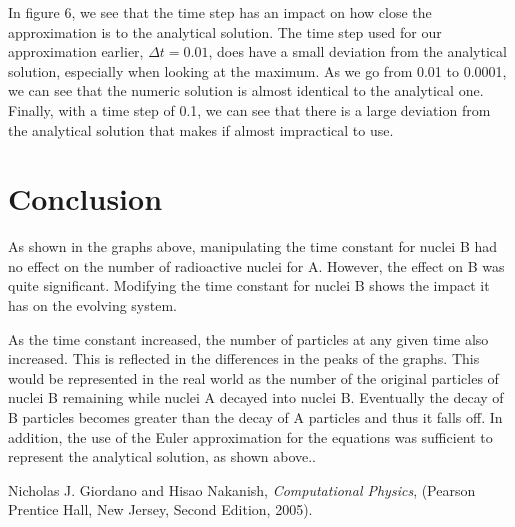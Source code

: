 \documentclass[pra,twocolumn,showpacs,amsmath,amssymb]{revtex4-2}
\begin{document}
In figure 6, we see that the time step has an impact on how close the approximation is to the analytical solution. The time step used for our approximation earlier, $\Delta t = 0.01$, does have a small deviation from the analytical solution, especially when looking at the maximum. As we go from 0.01 to 0.0001, we can see that the numeric solution is almost identical to the analytical one. Finally, with a time step of 0.1, we can see that there is a large deviation from the analytical solution that makes if almost impractical to use.



\section{Conclusion} 
\label{sec:conclusion}


As shown in the graphs above, manipulating the time constant for nuclei B had no effect on the number of radioactive nuclei for A. However, the effect on B was quite significant. Modifying the time constant for nuclei B shows the impact it has on the evolving system.

\par As the time constant increased, the number of particles at any given time also increased. This is reflected in the differences in the peaks of the graphs. This would be represented in the real world as the number of the original particles of nuclei B remaining while nuclei A decayed into nuclei B. Eventually the decay of B particles becomes greater than the decay of A particles and thus it falls off. In addition, the use of the Euler approximation for the equations was sufficient to represent the analytical solution, as shown above..

\begin{thebibliography}{9}
Nicholas J. Giordano and Hisao Nakanish,
\textit{Computational Physics}, 
(Pearson Prentice Hall, New Jersey,
Second Edition,
2005).
\end{thebibliography}
\end{document}
